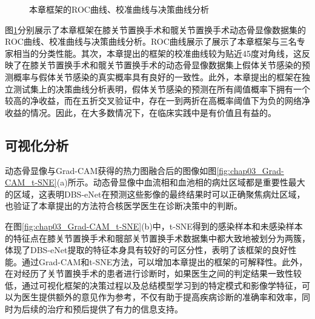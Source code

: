 \begin{figure}[htbp]
  \newline
  \caption{本章框架的ROC曲线、校准曲线与决策曲线分析}
  \label{fig:chap03_ROC_CC_DAC}
\end{figure}

图\ref{fig:chap03_ROC_CC_DAC}分别展示了本章框架在膝关节置换手术和髋关节置换手术动态骨显像数据集的ROC曲线、校准曲线与决策曲线分析。ROC曲线展示了展示了本章框架与三名专家相当的分类性能。其次，本章提出的框架的校准曲线较为贴近45度对角线，这反映了在膝关节置换手术和髋关节置换手术的动态骨显像数据集上假体关节感染的预测概率与假体关节感染的真实概率具有良好的一致性。此外，本章提出的框架在独立测试集上的决策曲线分析表明，假体关节感染的预测在所有阈值概率下拥有一个较高的净收益，而在五折交叉验证中，存在一到两折在高概率阈值下为负的网络净收益的情况。因此，在大多数情况下，在临床实践中是有价值且有益的。



\subsection{可视化分析}

动态骨显像与Grad-CAM获得的热力图融合后的图像如图\ref{fig:chap03_Grad-CAM_t-SNE}(a)所示。动态骨显像中血流相和血池相的病灶区域都是重要性最大的区域，这表明DBS-eNet在预测这些影像的最终结果时可以正确聚焦病灶区域，也验证了本章提出的方法符合核医学医生在诊断决策中的判断。

在图\ref{fig:chap03_Grad-CAM_t-SNE}(b)中，t-SNE得到的感染样本和未感染样本的特征点在膝关节置换手术和髋部关节置换手术数据集中都大致地被划分为两簇，体现了DBS-eNet提取的特征本身具有较好的可区分性，表明了该框架的良好性能。通过Grad-CAM和t-SNE方法，可以增加本章提出的框架的可解释性。此外，在对经历了关节置换手术的患者进行诊断时，如果医生之间的判定结果一致性较低，通过可视化框架的决策过程以及总结模型学习到的特定模式和影像学特征，可以为医生提供额外的意见作为参考，不仅有助于提高疾病诊断的准确率和效率，同时为后续的治疗和预后提供了有力的信息支持。

